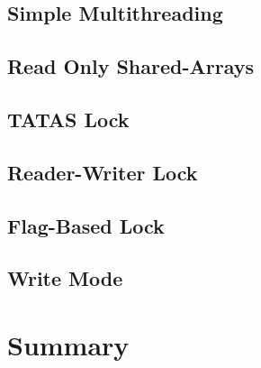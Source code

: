 \documentclass[11pt]{article}
\begin{document}
\subsection{Simple Multithreading}

\subsection{Read Only Shared-Arrays}

\subsection{TATAS Lock}

\subsection{Reader-Writer Lock}

\subsection{Flag-Based Lock}

\subsection{Write Mode}


\section{Summary}
\end{document}
